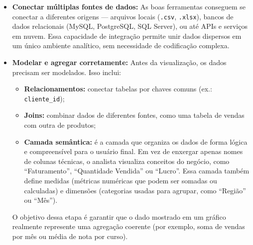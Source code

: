 \begin{itemize}[leftmargin=*]

  \item \textbf{Conectar múltiplas fontes de dados:}  
  As boas ferramentas conseguem se conectar a diferentes origens — arquivos locais (\texttt{.csv}, \texttt{.xlsx}), bancos de dados relacionais (MySQL, PostgreSQL, SQL Server), ou até APIs e serviços em nuvem. Essa capacidade de integração permite unir dados dispersos em um único ambiente analítico, sem necessidade de codificação complexa.

  \item \textbf{Modelar e agregar corretamente:}  
  Antes da visualização, os dados precisam ser modelados. Isso inclui:
  \begin{itemize}
    \item \textbf{Relacionamentos:} conectar tabelas por chaves comuns (ex.: \texttt{cliente\_id});
    \item \textbf{Joins:} combinar dados de diferentes fontes, como uma tabela de vendas com outra de produtos;
    \item \textbf{Camada semântica:} é a camada que organiza os dados de forma lógica e compreensível para o usuário final.  
    Em vez de enxergar apenas nomes de colunas técnicas, o analista visualiza conceitos do negócio, como “Faturamento”, “Quantidade Vendida” ou “Lucro”.  
    Essa camada também define medidas (métricas numéricas que podem ser somadas ou calculadas) e dimensões (categorias usadas para agrupar, como “Região” ou “Mês”).
  \end{itemize}
  O objetivo dessa etapa é garantir que o dado mostrado em um gráfico realmente represente uma agregação coerente (por exemplo, soma de vendas por mês ou média de nota por curso).


\end{itemize}
